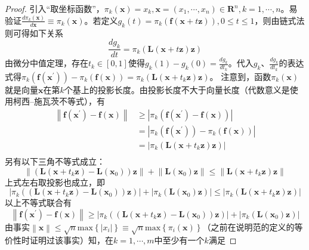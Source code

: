\documentclass[main.tex]{subfiles}
\begin{document}
\begin{proof}
引入“取坐标函数”，$\pi_k\left(\mathbf{x}\right)=x_k,\mathbf{x}=\left(x_1,\cdots,x_n\right)\in\mathbf{R}^n,k=1,\cdots,n$。易验证$\frac{d\pi_k\left(\mathbf{x}\right)}{d\mathbf{x}}\equiv\pi_k\left(\mathbf{x}\right)$。若定义$g_k\left(t\right)=\pi_k\left(\mathbf{f}\left(\mathbf{x}+t\mathbf{z}\right)\right),0\leq t\leq 1$，则由链式法则可得如下关系
\[
\frac{dg_k}{dt}=\pi_k\left(\mathbf{L}\left(\mathbf{x}+t\mathbf{z}\right)\mathbf{z}\right)\]
由微分中值定理，存在$t_k\in\left[0,1\right]$使得$g_k\left(1\right)-g_k\left(0\right)=\frac{dg_k}{dt_k}$。代入$g_k$、$\frac{dg_k}{dt_k}$的表达式得$\pi_k\left(\mathbf{f}\left(\mathbf{x}^\prime\right)\right)-\pi_k\left(\mathbf{f}\left(\mathbf{x}\right)\right)=\pi_k\left(\mathbf{L}\left(\mathbf{x}+t_k\mathbf{z}\right)\mathbf{z}\right)$。
注意到，函数$\pi_k\left(\mathbf{x}\right)$就是向量$\mathbf{x}$在第$k$个基上的投影长度。由投影长度不大于向量长度（代数意义是使用柯西--施瓦茨不等式），有
\begin{align*}
\left\|\mathbf{f}\left(\mathbf{x}^\prime\right)-\mathbf{f}\left(\mathbf{x}\right)\right\|&\geq\left|\pi_k\left(\mathbf{f}\left(\mathbf{x}^\prime\right)-\mathbf{f}\left(\mathbf{x}\right)\right)\right|\\
&=\left|\pi_k\left(\mathbf{f}\left(\mathbf{x}^\prime\right)\right)-\pi_k\left(\mathbf{f}\left(\mathbf{x}\right)\right)\right|\\
&=\left|\pi_k\left(\mathbf{L}\left(\mathbf{x}+t_k\mathbf{z}\right)\mathbf{z}\right)\right|\\
\end{align*}
另有以下三角不等式成立：
\[
\left\|\left(\mathbf{L}\left(\mathbf{x}+t_k\mathbf{z}\right)-\mathbf{L}\left(\mathbf{x}_0\right)\right)\mathbf{z}\right\|+\left\|\mathbf{L}\left(\mathbf{x}_0\right)\mathbf{z}\right\|\leq\left\|\mathbf{L}\left(\mathbf{x}+t_k\mathbf{z}\right)\mathbf{z}\right\|
\]
上式左右取投影也成立，即
\[\left|\pi_k\left(\left(\mathbf{L}\left(\mathbf{x}+t_k\mathbf{z}\right)-\mathbf{L}\left(\mathbf{x}_0\right)\right)\mathbf{z}\right)\right|+\left|\pi_k\left(\mathbf{L}\left(\mathbf{x}_0\right)\mathbf{z}\right)\right|\leq\left|\pi_k\left(\mathbf{L}\left(\mathbf{x}+t_k\mathbf{z}\right)\mathbf{z}\right)\right|
\]
以上不等式联合有
\[
\left\|\mathbf{f}\left(\mathbf{x}^\prime\right)-\mathbf{f}\left(\mathbf{x}\right)\right\|\geq\left|\pi_k\left(\left(\mathbf{L}\left(\mathbf{x}+t_k\mathbf{z}\right)-\mathbf{L}\left(\mathbf{x}_0\right)\right)\mathbf{z}\right)\right|+\left|\pi_k\left(\mathbf{L}\left(\mathbf{x}_0\right)\mathbf{z}\right)\right|
\]
由事实$\left\|\mathbf{x}\right\|\leq\sqrt{n}\mathrm{max}\left\{\left|x_i\right|\right\}\equiv\sqrt{n}\mathrm{max}\left\{\pi_i\left(\mathbf{x}\right)\right\}$（之前在说明范的定义的等价性时证明过该事实）知，在$k=1,\cdots,m$中至少有一个$k$满足

\end{proof}
\end{document}
